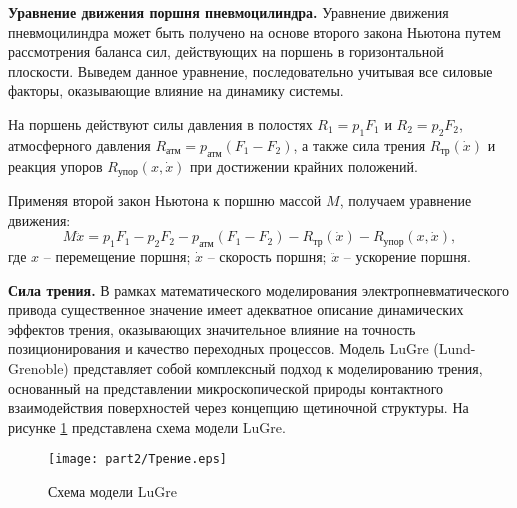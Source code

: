 \textbf{Уравнение движения поршня пневмоцилиндра.}
Уравнение движения пневмоцилиндра может быть получено на основе второго закона Ньютона путем
рассмотрения баланса сил, действующих на поршень в горизонтальной плоскости. Выведем данное уравнение,
последовательно учитывая все силовые факторы, оказывающие влияние на динамику системы.

На поршень действуют силы давления в полостях $R_1 = p_1F_1$ и $R_2 = p_2F_2$, атмосферного
давления $R_\text{атм} = p_\text{атм}(F_1 - F_2)$, а также сила
трения $R_\text{тр}(\dot{x})$ и реакция упоров $R_\text{упор}(x,\dot{x})$ при достижении крайних положений.

Применяя второй закон Ньютона к поршню массой $M$, получаем уравнение движения:
\begin{equation}
	M\ddot{x} = p_1F_1 - p_2F_2 - p_\text{атм}(F_1 - F_2) - R_\text{тр}(\dot{x}) - R_\text{упор}(x,\dot{x}),
\end{equation}
где $x$ -- перемещение поршня; $\dot{x}$ -- скорость поршня; $\ddot{x}$ -- ускорение поршня.


\textbf{Сила трения.}
В рамках математического моделирования электропневматического привода существенное значение имеет адекватное описание динамических эффектов трения,
оказывающих значительное влияние на точность позиционирования и качество переходных процессов.
Модель LuGre (Lund-Grenoble) \cite{lugre} представляет собой комплексный подход к моделированию трения,
основанный на представлении микроскопической природы контактного
взаимодействия поверхностей через концепцию щетиночной структуры.
На рисунке \ref{fig:ch2/lugre} представлена схема модели LuGre.

\begin{figure}[ht]
	\centering
	\texttt{[image: part2/Трение.eps]}
	\caption{Схема модели LuGre}
	\label{fig:ch2/lugre}
\end{figure}

